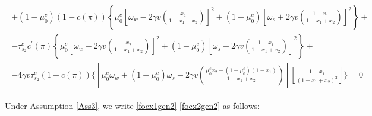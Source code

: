 \documentclass[12pt,a4paper]{article}
\begin{document}
\begin{small}
\begin{eqnarray}
\begin{split}
        +(1-\mu_0^c)(1-c(\pi))\left\{\mu_0^c\left[\omega_w-2\gamma v\left(\frac{x_2}{1-x_1+x_2}\right)\right]^2+(1-\mu_0^c)\left[\omega_s+2\gamma v\left(\frac{1-x_1}{1-x_1+x_2}\right)\right]^2\right\}+\\
        -\tau_{s_2}^cc^\prime(\pi)\left\{\mu_0^c\left[\omega_w-2\gamma v\left(\frac{x_2}{1-x_1+x_2}\right)\right]^2+(1-\mu_0^c)\left[\omega_s+2\gamma v\left(\frac{1-x_1}{1-x_1+x_2}\right)\right]^2\right\}+\\
        -4\gamma v\tau_{s_2}^c(1-c(\pi))\Bigg\{\left[\mu_0^c\omega_w+(1-\mu_0^c)\omega_s-2\gamma v\left(\frac{\mu_0^cx_2-(1-\mu_0^c)(1-x_1)}{1-x_1+x_2}\right)\right]\left[\frac{1-x_1}{(1-x_1+x_2)^2}\right]\Bigg\}=0
    \end{split}
\end{eqnarray}
\end{small}
Under Assumption \ref{Ass3}, we write \eqref{focx1gen2}-\eqref{focx2gen2} as follows:
\end{document}
